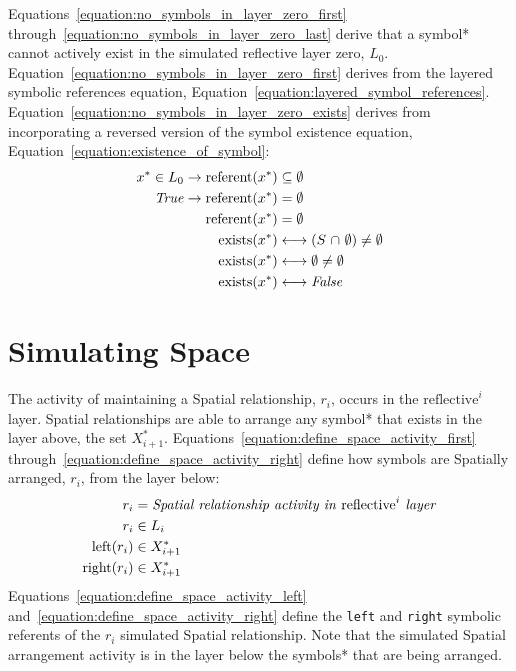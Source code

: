 Equations~\ref{equation:no_symbols_in_layer_zero_first}
through~\ref{equation:no_symbols_in_layer_zero_last} derive that a
symbol* cannot actively exist in the simulated reflective layer zero,
$L_0$.  Equation~\ref{equation:no_symbols_in_layer_zero_first} derives
from the layered symbolic references equation,
Equation~\ref{equation:layered_symbol_references}.
Equation~\ref{equation:no_symbols_in_layer_zero_exists} derives from
incorporating a reversed version of the symbol existence equation,
Equation~\ref{equation:existence_of_symbol}:
\begin{align}
\label{equation:no_symbols_in_layer_zero_first}
       x^* \in L_0 \rightarrow \text{referent}(x^*) &\subseteq \emptyset \\
\text{\emph{True}} \rightarrow \text{referent}(x^*) &= \emptyset \\
                               \text{referent}(x^*) &= \emptyset \\
\label{equation:no_symbols_in_layer_zero_exists}
\text{exists}(x^*) &\longleftrightarrow (S ~{\cap}~ \emptyset) \neq \emptyset \\
\text{exists}(x^*) &\longleftrightarrow \emptyset \neq \emptyset \\
\text{exists}(x^*) &\longleftrightarrow \text{\emph{False}}
\label{equation:no_symbols_in_layer_zero_last}
\end{align}

\section{Simulating Space}

The activity of maintaining a Spatial relationship, $r_i$, occurs in
the $\text{reflective}^i$ layer.  Spatial relationships are able to
arrange any symbol* that exists in the layer
above, the set $X_{i+1}^*$.
Equations~\ref{equation:define_space_activity_first}
through~\ref{equation:define_space_activity_right} define how symbols
are Spatially arranged, $r_i$, from the layer below:
\begin{align}
\label{equation:define_space_activity_first}
              r_i &= \text{\emph{Spatial relationship activity in} reflective}^i\text{\emph{ layer}} \\
              r_i &\in L_i \\
\label{equation:define_space_activity_left}
 \text{left}(r_i) &\in X_{i+1}^* \\
\label{equation:define_space_activity_right}
\text{right}(r_i) &\in X_{i+1}^*
\end{align}
Equations~\ref{equation:define_space_activity_left}
and~\ref{equation:define_space_activity_right} define the {\tt left}
and {\tt right} symbolic referents of the $r_i$ simulated Spatial
relationship.  Note that the simulated Spatial arrangement activity is
in the layer below the symbols* that are being arranged.

